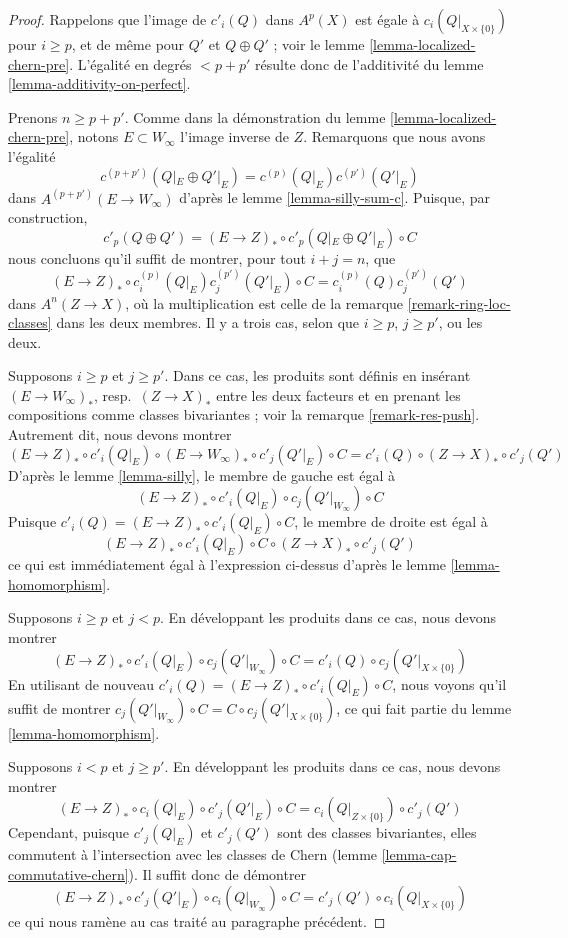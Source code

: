 \begin{proof}
Rappelons que l'image de $c'_i(Q)$ dans $A^p(X)$ est égale à
$c_i(Q|_{X \times \{0\}})$ pour $i \geq p$, et de même pour
$Q'$ et $Q \oplus Q'$ ; voir le lemme \ref{lemma-localized-chern-pre}.
L'égalité en degrés $< p + p'$ résulte donc de
l'additivité du lemme \ref{lemma-additivity-on-perfect}.

\medskip\noindent
Prenons $n \geq p + p'$.
Comme dans la démonstration du lemme \ref{lemma-localized-chern-pre},
notons $E \subset W_\infty$ l'image inverse de $Z$.
Remarquons que nous avons l'égalité
$$
c^{(p + p')}(Q|_E \oplus Q'|_E) =
c^{(p)}(Q|_E)c^{(p')}(Q'|_E)
$$
dans $A^{(p + p')}(E \to W_\infty)$ d'après le lemme \ref{lemma-silly-sum-c}.
Puisque, par construction,
$$
c'_p(Q \oplus Q') = (E \to Z)_* \circ c'_p(Q|_E \oplus Q'|_E) \circ C
$$
nous concluons qu'il suffit de montrer, pour tout $i + j = n$, que
$$
(E \to Z)_* \circ c^{(p)}_i(Q|_E)c^{(p')}_j(Q'|_E) \circ C
=
c^{(p)}_i(Q)c^{(p')}_j(Q')
$$
dans $A^n(Z \to X)$, où la multiplication est celle de la
remarque \ref{remark-ring-loc-classes} dans les deux membres. Il y a
trois cas, selon que $i \geq p$, $j \geq p'$, ou les deux.

\medskip\noindent
Supposons $i \geq p$ et $j \geq p'$. Dans ce cas, les produits sont
définis en insérant $(E \to W_\infty)_*$, resp.\ $(Z \to X)_*$ entre
les deux facteurs et en prenant les compositions comme classes bivariantes ; voir la
remarque \ref{remark-res-push}.
Autrement dit, nous devons montrer
$$
(E \to Z)_* \circ c'_i(Q|_E) \circ
(E \to W_\infty)_* \circ c'_j(Q'|_E) \circ C =
c'_i(Q) \circ (Z \to X)_* \circ c'_j(Q')
$$
D'après le lemme \ref{lemma-silly}, le membre de gauche est égal à
$$
(E \to Z)_* \circ c'_i(Q|_E) \circ c_j(Q'|_{W_\infty}) \circ C
$$
Puisque $c'_i(Q) = (E \to Z)_* \circ c'_i(Q|_E) \circ C$,
le membre de droite est égal à
$$
(E \to Z)_* \circ c'_i(Q|_E) \circ C \circ (Z \to X)_* \circ c'_j(Q')
$$
ce qui est immédiatement égal à l'expression ci-dessus
d'après le lemme \ref{lemma-homomorphism}.

\medskip\noindent
Supposons $i \geq p$ et $j < p$. En développant les produits
dans ce cas, nous devons montrer
$$
(E \to Z)_* \circ c'_i(Q|_E) \circ c_j(Q'|_{W_\infty}) \circ C =
c'_i(Q) \circ c_j(Q'|_{X \times \{0\}})
$$
En utilisant de nouveau $c'_i(Q) = (E \to Z)_* \circ c'_i(Q|_E) \circ C$,
nous voyons qu'il suffit de montrer $c_j(Q'|_{W_\infty}) \circ C =
C \circ c_j(Q'|_{X \times \{0\}})$, ce qui fait partie du
lemme \ref{lemma-homomorphism}.

\medskip\noindent
Supposons $i < p$ et $j \geq p'$. En développant les produits
dans ce cas, nous devons montrer
$$
(E \to Z)_* \circ c_i(Q|_E) \circ c'_j(Q'|_E) \circ C =
c_i(Q|_{Z \times \{0\}}) \circ c'_j(Q')
$$
Cependant, puisque $c'_j(Q|_E)$ et $c'_j(Q')$ sont des
classes bivariantes, elles commutent à l'intersection avec les classes de Chern
(lemme \ref{lemma-cap-commutative-chern}). Il suffit donc de démontrer
$$
(E \to Z)_* \circ c'_j(Q'|_E) \circ c_i(Q|_{W_\infty}) \circ C =
c'_j(Q') \circ c_i(Q|_{X \times \{0\}})
$$
ce qui nous ramène au cas traité au paragraphe précédent.
\end{proof}

